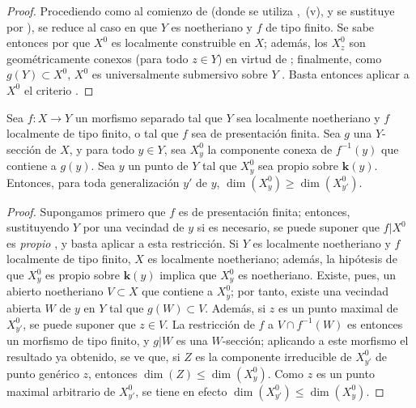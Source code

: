 \begin{proof}
Procediendo como al comienzo de  (donde se utiliza ,~(v), y se sustituye  por ), se reduce al caso en que $Y$ es noetheriano y $f$ de tipo finito. Se sabe entonces por  que $X^0$ es localmente construible en $X$; además, los $X_z^0$ son geométricamente conexos (para todo $z\in Y$) en virtud de ; finalmente, como $g(Y)\subset X^0$, $X^0$ es universalmente submersivo sobre $Y$ .
Basta entonces aplicar a $X^0$ el criterio .
\end{proof}

\begin{corollary}[15.6.9]
\label{IV.15.6.9}
Sea $f:X\to Y$ un morfismo separado tal que $Y$ sea localmente noetheriano y $f$ localmente de tipo finito, \textup{o} tal que $f$ sea de presentación finita.
Sea $g$ una $Y$-sección de $X$, y para todo $y\in Y$, sea $X_y^0$ la componente conexa de $f^{-1}(y)$ que contiene a $g(y)$.
Sea $y$ un punto de $Y$ tal que $X_y^0$ sea propio sobre $\boldsymbol{k}(y)$.
Entonces, para toda generalización $y'$ de $y$, $\dim(X_y^0)\geqslant\dim(X_{y'}^0)$.
\end{corollary}

\begin{proof}
Supongamos primero que $f$ es de presentación finita; entonces, sustituyendo $Y$ por una vecindad de $y$ si es necesario, se puede suponer que $f|X^0$ es \emph{propio} , y basta aplicar  a esta restricción.
Si $Y$ es localmente noetheriano y $f$ localmente de tipo finito, $X$ es localmente noetheriano; además, la hipótesis de que $X_y^0$ es propio sobre $\boldsymbol{k}(y)$ implica que $X_y^0$ es noetheriano. Existe, pues, un abierto noetheriano $V\subset X$ que contiene a $X_y^0$; por tanto, existe una vecindad abierta $W$ de $y$ en $Y$ tal que $g(W)\subset V$.
Además, si $z$ es un punto maximal de $X_{y'}^0$, se puede suponer que $z\in V$. La restricción de $f$ a $V\cap f^{-1}(W)$ es entonces un morfismo de tipo finito, y $g|W$ es una $W$-sección; aplicando a este morfismo el resultado ya obtenido, se ve que, si $Z$ es la componente irreducible de $X_{y'}^0$ de punto genérico $z$, entonces $\dim(Z)\leqslant\dim(X_y^0)$. Como $z$ es un punto maximal arbitrario de $X_{y'}^0$, se tiene en efecto $\dim(X_{y'}^0)\leqslant\dim(X_y^0)$.
\end{proof}

